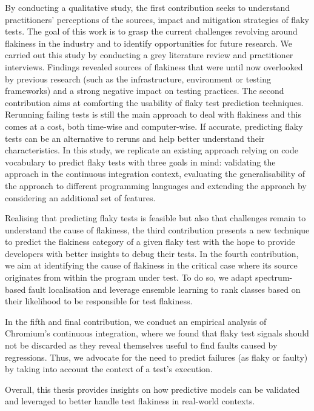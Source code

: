 By conducting a qualitative study, the first contribution seeks to understand practitioners' perceptions of the sources, impact and mitigation strategies of flaky tests. The goal of this work is to grasp the current challenges revolving around flakiness in the industry and to identify opportunities for future research. We carried out this study by conducting a grey literature review and practitioner interviews. Findings revealed sources of flakiness that were until now overlooked by previous research (such as the infrastructure, environment or testing frameworks) and a strong negative impact on testing practices. The second contribution aims at comforting the usability of flaky test prediction techniques. Rerunning failing tests is still the main approach to deal with flakiness and this comes at a cost, both time-wise and computer-wise. If accurate, predicting flaky tests can be an alternative to reruns and help better understand their characteristics. In this study, we replicate an existing approach relying on code vocabulary to predict flaky tests with three goals in mind: validating the approach in the continuous integration context, evaluating the generalisability of the approach to different programming languages and extending the approach by considering an additional set of features. 

Realising that predicting flaky tests is feasible but also that challenges remain to understand the cause of flakiness, the third contribution presents a new technique to predict the flakiness category of a given flaky test with the hope to provide developers with better insights to debug their tests. In the fourth contribution, we aim at identifying the cause of flakiness in the critical case where its source originates from within the program under test. To do so, we adapt spectrum-based fault localisation and leverage ensemble learning to rank classes based on their likelihood to be responsible for test flakiness. 

In the fifth and final contribution, we conduct an empirical analysis of Chromium's continuous integration, where we found that flaky test signals should not be discarded as they reveal themselves useful to find faults caused  by regressions. Thus, we advocate for the need to predict failures (as flaky or faulty) by taking into account the context of a test's execution.

Overall, this thesis provides insights on how predictive models can be validated and leveraged to better handle test flakiness in real-world contexts.  